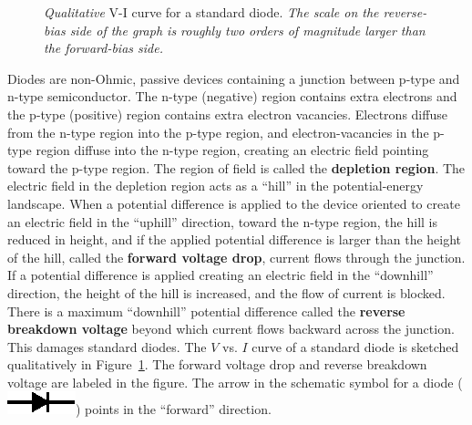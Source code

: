 \documentclass[11pt]{article}
\begin{document}
\begin{figure}[ht]
  \begin{center}
    \caption{\emph{Qualitative} V-I curve for a standard
      diode. \emph{The scale on the reverse-bias side of the graph is
      roughly two orders of magnitude larger than the forward-bias
      side.}}
    \label{fig:diodevi}
  \end{center}
\end{figure}

Diodes are non-Ohmic, passive devices containing a junction between
p-type and n-type semiconductor. The n-type (negative) region contains
extra electrons and the p-type (positive) region contains extra
electron vacancies. Electrons diffuse from the n-type region into the
p-type region, and electron-vacancies in the p-type region diffuse
into the n-type region, creating an electric field pointing toward the
p-type region. The region of field is called the \textbf{depletion
  region}. The electric field in the depletion region acts as a
``hill'' in the potential-energy landscape. When a potential
difference is applied to the device oriented to create an electric
field in the ``uphill'' direction, toward the n-type region, the hill
is reduced in height, and if the applied potential difference is
larger than the height of the hill, called the \textbf{forward voltage
  drop}, current flows through the junction.  If a potential
difference is applied creating an electric field in the ``downhill''
direction, the height of the hill is increased, and the flow of
current is blocked. There is a maximum ``downhill'' potential
difference called the \textbf{reverse breakdown voltage} beyond which
current flows backward across the junction. This damages standard
diodes.  The $V$ vs. $I$ curve of a standard diode is sketched
qualitatively in Figure~\ref{fig:diodevi}. The forward voltage drop
and reverse breakdown voltage are labeled in the figure. The arrow in
the schematic symbol for a diode (\includegraphics{diode.eps}) points
in the ``forward'' direction.
\end{document}
